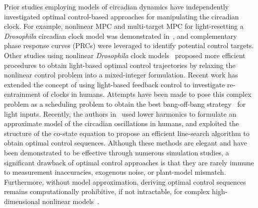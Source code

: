 Prior studies employing models of circadian dynamics have independently investigated optimal control-based approaches for manipulating the circadian clock. For example, nonlinear MPC and multi-target MPC for light-resetting a \textit{Drosophila} circadian clock model was demonstrated in~\cite{Bagheri2007,Bagheri2008a}, and complementary phase response curves (PRCs) were leveraged to identify potential control targets.
Other studies using nonlinear \textit{Drosophila} clock models~\cite{Slaby2007, Shaik2008} proposed more efficient procedures to obtain light-based optimal control trajectories by relaxing the nonlinear control problem into a mixed-integer formulation.
Recent work has extended the concept of using light-based feedback control to investigate re-entrainment of clocks in humans. Attempts have been made to pose this complex problem as a scheduling problem to obtain the best bang-off-bang strategy~\cite{Serkh2014} for light inputs. Recently, the authors in~\cite{Zhang2016} used lower harmonics to formulate an approximate model of the circadian oscillations in humans, and exploited the structure of the co-state equation to propose an efficient line-search algorithm to obtain optimal control sequences.
Although these methods are elegant and have been demonstrated to be effective through numerous simulation studies, a significant drawback of optimal control approaches is that they are rarely immune to measurement inaccuracies, exogenous noise, or plant-model mismatch.
Furthermore, without model approximation, deriving optimal control sequences remains computationally prohibitive, if not intractable, for complex high-dimensional nonlinear models~\cite{Shaik2008}.

